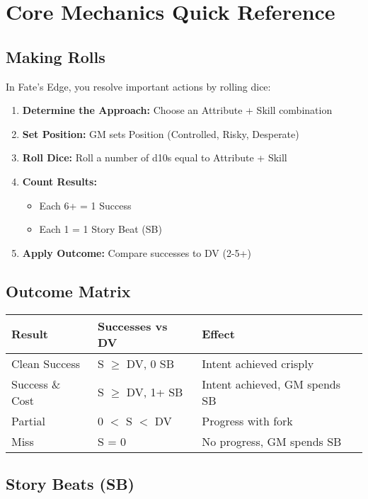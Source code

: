 \documentclass[11pt]{article}
\begin{document}
\section{Core Mechanics Quick Reference}

\subsection{Making Rolls}

In Fate's Edge, you resolve important actions by rolling dice:
\begin{enumerate}
\item \textbf{Determine the Approach:} Choose an Attribute + Skill combination
\item \textbf{Set Position:} GM sets Position (Controlled, Risky, Desperate)
\item \textbf{Roll Dice:} Roll a number of d10s equal to Attribute + Skill
\item \textbf{Count Results:}
   \begin{itemize}
   \item Each 6+ = 1 Success
   \item Each 1 = 1 Story Beat (SB)
   \end{itemize}
\item \textbf{Apply Outcome:} Compare successes to DV (2-5+)
\end{enumerate}

\subsection{Outcome Matrix}

\begin{center}
\begin{tabular}{|l|l|l|}
\hline
\textbf{Result} & \textbf{Successes vs DV} & \textbf{Effect} \\
\hline
Clean Success & S $\geq$ DV, 0 SB & Intent achieved crisply \\
Success \& Cost & S $\geq$ DV, 1+ SB & Intent achieved, GM spends SB \\
Partial & 0 $<$ S $<$ DV & Progress with fork \\
Miss & S = 0 & No progress, GM spends SB \\
\hline
\end{tabular}
\end{center}

\subsection{Story Beats (SB)}
\end{document}
